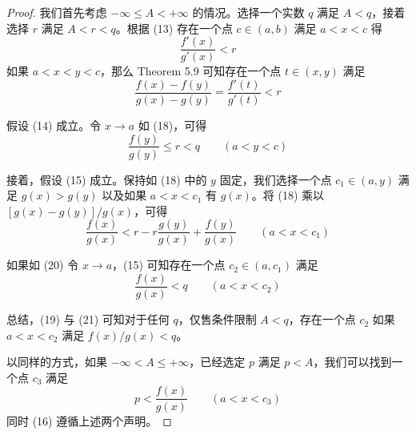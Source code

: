 \documentclass[../poma-notes.tex]{subfiles}
\begin{document}
\begin{proof}
  我们首先考虑 $-\infty \le A < +\infty$ 的情况。选择一个实数 $q$ 满足 $A < q$，接着选择 $r$ 满足 $A < r < q$。根据 (13)
  存在一个点 $c \in (a,b)$ 满足 $a < x < c$ 得
  \begin{equation}
    \frac{f'(x)}{g'(x)} < r
  \end{equation}
  如果 $a < x < y < c$，那么 Theorem 5.9 可知存在一个点 $t \in (x,y)$ 满足
  \begin{equation}
    \frac{f(x) - f(y)}{g(x) - g(y)} = \frac{f'(t)}{g'(t)} < r
  \end{equation}

  假设 (14) 成立。令 $x \to a$ 如 (18)，可得
  \begin{equation}
    \frac{f(y)}{g(y)} \le r < q \qquad (a<y<c)
  \end{equation}

  接着，假设 (15) 成立。保持如 (18) 中的 $y$ 固定，我们选择一个点 $c_1 \in (a,y)$ 满足 $g(x) > g(y)$ 以及如果 $a<x<c_1$ 有
  $g(x)$。将 (18) 乘以 $[g(x) - g(y)]/g(x)$，可得
  \begin{equation}
    \frac{f(x)}{g(x)} < r - r \frac{g(y)}{g(x)} + \frac{f(y)}{g(x)} \qquad (a<x<c_1)
  \end{equation}

  如果如 (20) 令 $x \to a$，(15) 可知存在一个点 $c_2 \in (a, c_1)$ 满足
  \begin{equation}
    \frac{f(x)}{g(x)} < q \qquad (a < x < c_2)
  \end{equation}

  总结，(19) 与 (21) 可知对于任何 $q$，仅售条件限制 $A < q$，存在一个点 $c_2$ 如果 $a < x < c_2$ 满足 $f(x)/g(x) < q$。

  以同样的方式，如果 $-\infty < A \le +\infty$，已经选定 $p$ 满足 $p < A$，我们可以找到一个点 $c_3$ 满足
  \begin{equation}
    p < \frac{f(x)}{g(x)} \qquad (a<x<c_3)
  \end{equation}
  同时 (16) 遵循上述两个声明。
\end{proof}
\end{document}
